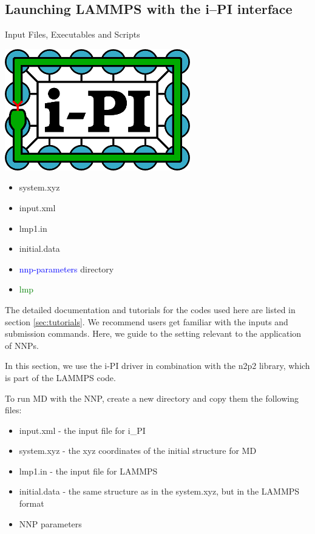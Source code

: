 \documentclass[12pt]{article}
\begin{document}
\subsection{Launching LAMMPS with the i--PI interface}
\begin{mybox2}{{Input Files, Executables and Scripts}}
\begin{minipage}[c]{0.5\linewidth}
\includegraphics[scale=0.35]{latex_files/ipi-logo-alpha.png}
\end{minipage}
\begin{minipage}[c]{0.5\linewidth}
\begin{itemize}
    \item system.xyz
    \item input.xml
    \item lmp1.in
    \item initial.data
    \item \textcolor{blue}{nnp-parameters} directory
    \item \textcolor{green}{lmp}
\end{itemize}
\end{minipage}
\end{mybox2}

The detailed documentation and tutorials for the codes used here are listed in section \ref{sec:tutorials}. We recommend users get familiar with the inputs and submission commands. Here, we guide to the setting relevant to the application of NNPs. 

In this section, we use the i-PI driver in combination with the n2p2 library, which is part of the LAMMPS code. 

To run MD with the NNP, create a new directory and copy them the following files:
\begin{itemize}
\item input.xml - the input file for i\_PI
\item system.xyz - the xyz coordinates of the initial structure for MD
\item lmp1.in - the input file for LAMMPS
\item initial.data - the same structure as in the system.xyz, but in the LAMMPS format 
\item NNP parameters
\end{itemize}
\end{document}
